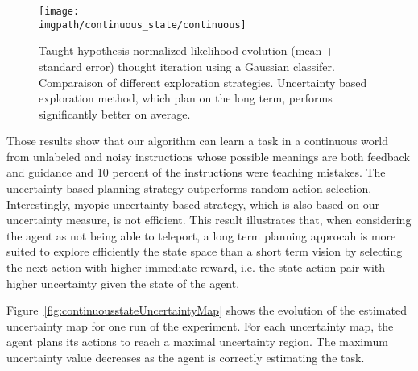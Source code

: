 \begin{figure}[!htbp]
  \centering
  \texttt{[image: \\imgpath/continuous\_state/continuous]}
  \caption{Taught hypothesis normalized likelihood evolution (mean + standard error) thought iteration using a Gaussian classifer. Comparaison of different exploration strategies. Uncertainty based exploration method, which plan on the long term, performs significantly better on average.}
  \label{fig:continuousstateRmax}
\end{figure}

Those results show that our algorithm can learn a task in a continuous world from unlabeled and noisy instructions whose possible meanings are both feedback and guidance and 10 percent of the instructions were teaching mistakes. The uncertainty based planning strategy outperforms random action selection. Interestingly, myopic uncertainty based strategy, which is also based on our uncertainty measure, is not efficient. This result illustrates that, when considering the agent as not being able to teleport, a long term planning approcah is more suited to explore efficiently the state space than a short term vision by selecting the next action with higher immediate reward, i.e. the state-action pair with higher uncertainty given the state of the agent. 


Figure~\ref{fig:continuousstateUncertaintyMap} shows the evolution of the estimated uncertainty map for one run of the experiment. For each uncertainty map, the agent plans its actions to reach a maximal uncertainty region. The maximum uncertainty value decreases as the agent is correctly estimating the task.

